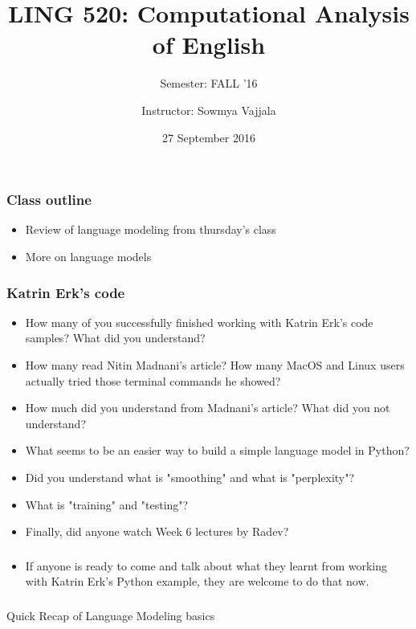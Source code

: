 \documentclass{beamer}
\author[Sowmya Vajjala]{Instructor: Sowmya Vajjala}
\title[LING 520]{LING 520: Computational Analysis of English}
\subtitle{Semester: FALL '16}
\date{27 September 2016}
\institute{Iowa State University, USA}
\begin{document}
\begin{frame}\titlepage
\end{frame}

\begin{frame}
\frametitle{Class outline}
\begin{itemize}
\item Review of language modeling from thursday's class
\item More on language models
\end{itemize}
\end{frame}

\begin{frame}
\frametitle{Katrin Erk's code}
\begin{itemize}
\item How many of you successfully finished working with Katrin Erk's code samples? What did you understand? \pause
\item How many read Nitin Madnani's article? How many MacOS and Linux users actually tried those terminal commands he showed? \pause
\item How much did you understand from Madnani's article? What did you not understand? \pause
\item What seems to be an easier way to build a simple language model in Python? \pause
\item Did you understand what is "smoothing" and what is "perplexity"? \pause
\item What is "training" and "testing"? \pause
\item Finally, did anyone watch Week 6 lectures by Radev?
\end{itemize}
\end{frame}

\begin{frame}
\frametitle{}
\begin{itemize}
\item If anyone is ready to come and talk about what they learnt from working with Katrin Erk's Python example, they are welcome to do that now. 
\end{itemize}
\end{frame}

\begin{frame}
\frametitle{}
\begin{center}
\Large Quick Recap of Language Modeling basics
\end{center}
\end{frame}
\end{document}
